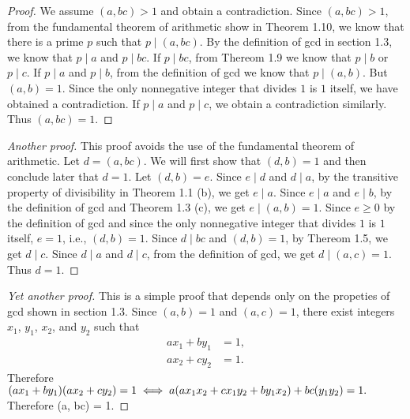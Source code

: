 \begin{proof}
  We assume \( (a, bc) > 1 \) and obtain a contradiction. Since \( (a,
  bc) > 1 \), from the fundamental theorem of arithmetic show in
  Theorem 1.10, we know that there is a prime \( p \) such that \( p
  \mid (a, bc) \). By the definition of gcd in section 1.3, we know
  that \( p \mid a \) and \( p \mid bc \). If \( p \mid bc \), from
  Thereom 1.9 we know that \( p \mid b \) or \( p \mid c \). If \( p
  \mid a \) and \( p \mid b \), from the definition of gcd we know
  that \( p \mid (a, b) \). But \( (a, b) = 1 \). Since the only
  nonnegative integer that divides \( 1 \) is \( 1 \) itself, we have
  obtained a contradiction. If \( p \mid a \) and \( p \mid c \), we
  obtain a contradiction similarly. Thus \( (a, bc) = 1 \).
\end{proof}

\begin{proof}[Another proof]
  This proof avoids the use of the fundamental theorem of arithmetic.
  Let \( d = (a, bc) \). We will first show that \( (d, b) = 1 \) and
  then conclude later that \( d = 1 \). Let \( (d, b) = e \). Since \(
  e \mid d \) and \( d \mid a \), by the transitive property of
  divisibility in Theorem 1.1 (b), we get \( e \mid a \). Since \( e
  \mid a \) and \( e \mid b \), by the definition of gcd and Theorem
  1.3 (c), we get \( e \mid (a, b) = 1 \). Since \( e \ge 0 \) by the
  definition of gcd and since the only nonnegative integer that
  divides \( 1 \) is \( 1 \) itself, \( e = 1 \), i.e., \( (d, b) = 1
  \). Since \( d \mid bc \) and \( (d, b) = 1 \), by Thereom 1.5, we
  get \( d \mid c \). Since \( d \mid a \) and \( d \mid c \), from
  the definition of gcd, we get \( d \mid (a, c) = 1 \). Thus \( d = 1
  \).
\end{proof}

\begin{proof}[Yet another proof]
  This is a simple proof that depends only on the propeties of gcd
  shown in section 1.3. Since \( (a, b) = 1 \) and \( (a, c) = 1 \),
  there exist integers \( x_1 \), \( y_1 \), \( x_2 \), and \( y_2 \)
  such that
  \begin{align*}
    a x_1 + b y_1 & = 1, \\
    a x_2 + c y_2 & = 1.
  \end{align*}
  Therefore
  \(
    (a x_1 + b y_1) (a x_2 + c y_2) = 1 \\
    \iff a (a x_1 x_2 + c x_1 y_2 + b y_1 x_2) + bc (y_1 y_2) = 1.
  \)
  Therefore (a, bc) = 1.
\end{proof}


